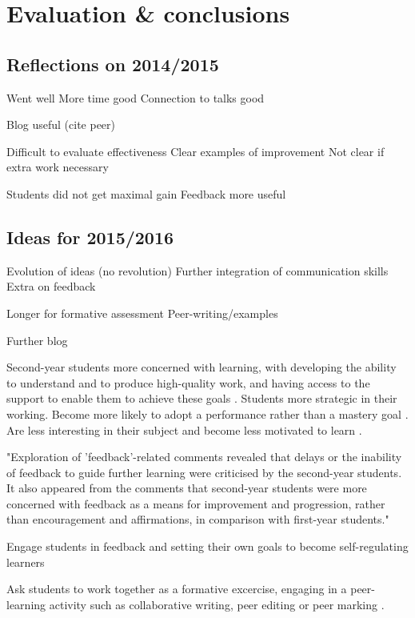 \chapter{Evaluation \& conclusions}\label{ch:conc}

\section{Reflections on 2014/2015}

Went well
More time good
Connection to talks good

Blog useful (cite peer)

Difficult to evaluate effectiveness
Clear examples of improvement
Not clear if extra work necessary

Students did not get maximal gain
Feedback more useful

\section{Ideas for 2015/2016}\label{sec:future}

Evolution of ideas (no revolution)
Further integration of communication skills
Extra on feedback

Longer for formative assessment
Peer-writing/examples

Further blog


Second-year students more concerned with learning, with developing the ability to understand and to produce high-quality work, and having access to the support to enable them to achieve these goals \citep{Zaitseva2013}. Students more strategic in their working. Become more likely to adopt a performance rather than a mastery goal \citep{Lieberman2007}. Are less interesting in their subject and become less motivated to learn \citep{Lieberman2007}.

"Exploration of 'feedback'-related comments revealed that delays or the
inability of feedback to guide further learning were criticised by the
second-year students. It also appeared from the comments that second-year
students were more concerned with feedback as a means for improvement
and progression, rather than encouragement and affirmations, in comparison
with first-year students." \citep{Zaitseva2013}

Engage students in feedback and setting their own goals to become self-regulating learners \citep{Nicol2006}

Ask students to work together as a formative excercise, engaging in a peer-learning activity such as collaborative writing, peer editing or peer marking \citep[chapter 1]{Falchikov2001}.

